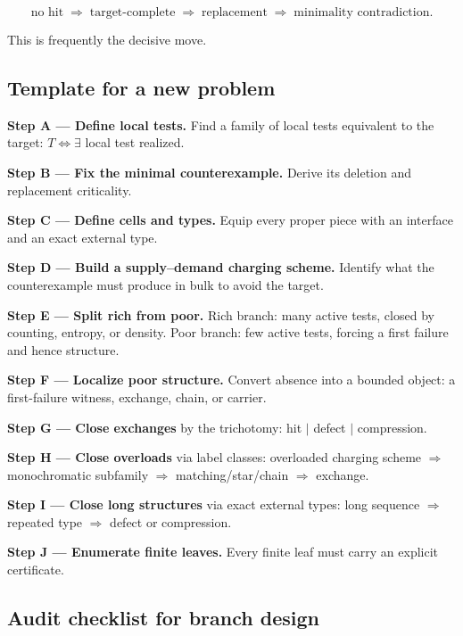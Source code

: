 \documentclass[
  11pt,
]{article}
\theoremstyle{definition}
\begin{document}
\[
\text{no hit}
\;\Rightarrow\;
\text{target-complete}
\;\Rightarrow\;
\text{replacement}
\;\Rightarrow\;
\text{minimality contradiction}.
\]

This is frequently the decisive move.



\subsection{Template for a new
problem}\label{template-for-a-new-problem}

\textbf{Step A --- Define local tests.} Find a family of local tests
equivalent to the target: \(T \iff \exists\) local test realized.

\textbf{Step B --- Fix the minimal counterexample.} Derive its deletion
and replacement criticality.

\textbf{Step C --- Define cells and types.} Equip every proper piece
with an interface and an exact external type.

\textbf{Step D --- Build a supply--demand charging scheme.} Identify
what the counterexample must produce in bulk to avoid the target.

\textbf{Step E --- Split rich from poor.} Rich branch: many active
tests, closed by counting, entropy, or density. Poor branch: few active
tests, forcing a first failure and hence structure.

\textbf{Step F --- Localize poor structure.} Convert absence into a
bounded object: a first-failure witness, exchange, chain, or carrier.

\textbf{Step G --- Close exchanges} by the trichotomy: hit \(\mid\)
defect \(\mid\) compression.

\textbf{Step H --- Close overloads} via label classes: overloaded
charging scheme \(\Rightarrow\) monochromatic subfamily \(\Rightarrow\)
matching/star/chain \(\Rightarrow\) exchange.

\textbf{Step I --- Close long structures} via exact external types: long
sequence \(\Rightarrow\) repeated type \(\Rightarrow\) defect or
compression.

\textbf{Step J --- Enumerate finite leaves.} Every finite leaf must
carry an explicit certificate.



\subsection{Audit checklist for branch
design}\label{audit-checklist-for-branch-design}
\end{document}
